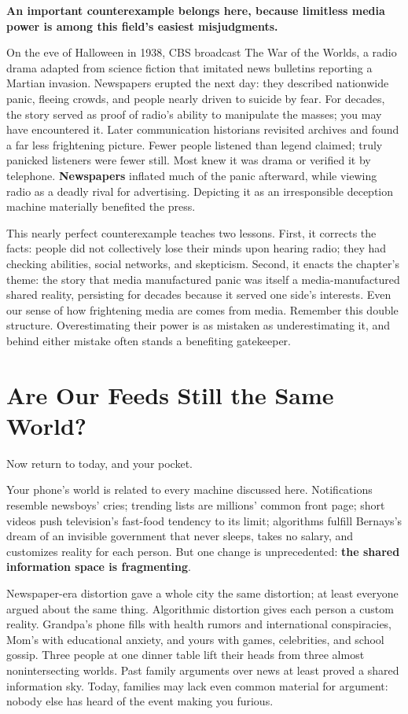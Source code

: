 \textbf{An important counterexample belongs here, because limitless media power is among this field's easiest misjudgments.}

On the eve of Halloween in 1938, CBS broadcast The War of the Worlds, a radio drama adapted from science fiction that imitated news bulletins reporting a Martian invasion. Newspapers erupted the next day: they described nationwide panic, fleeing crowds, and people nearly driven to suicide by fear. For decades, the story served as proof of radio's ability to manipulate the masses; you may have encountered it. Later communication historians revisited archives and found a far less frightening picture. Fewer people listened than legend claimed; truly panicked listeners were fewer still. Most knew it was drama or verified it by telephone. \textbf{Newspapers} inflated much of the panic afterward, while viewing radio as a deadly rival for advertising. Depicting it as an irresponsible deception machine materially benefited the press.

This nearly perfect counterexample teaches two lessons. First, it corrects the facts: people did not collectively lose their minds upon hearing radio; they had checking abilities, social networks, and skepticism. Second, it enacts the chapter's theme: the story that media manufactured panic was itself a media-manufactured shared reality, persisting for decades because it served one side's interests. Even our sense of how frightening media are comes from media. Remember this double structure. Overestimating their power is as mistaken as underestimating it, and behind either mistake often stands a benefiting gatekeeper.

\section{Are Our Feeds Still the Same World?}
Now return to today, and your pocket.

Your phone's world is related to every machine discussed here. Notifications resemble newsboys' cries; trending lists are millions' common front page; short videos push television's fast-food tendency to its limit; algorithms fulfill Bernays's dream of an invisible government that never sleeps, takes no salary, and customizes reality for each person. But one change is unprecedented: \textbf{the shared information space is fragmenting}.

Newspaper-era distortion gave a whole city the same distortion; at least everyone argued about the same thing. Algorithmic distortion gives each person a custom reality. Grandpa's phone fills with health rumors and international conspiracies, Mom's with educational anxiety, and yours with games, celebrities, and school gossip. Three people at one dinner table lift their heads from three almost nonintersecting worlds. Past family arguments over news at least proved a shared information sky. Today, families may lack even common material for argument: nobody else has heard of the event making you furious.

